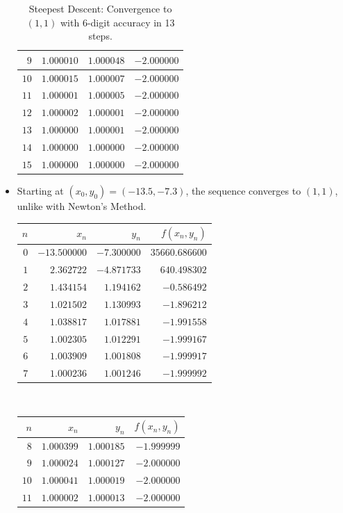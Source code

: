 \begin{example}
\begin{itemize}
\begin{table}[ht!]
\begin{tabular}{|r|r|r|r|}
	$9$ & $1.000010$ & $1.000048$ & $-2.000000$ \\ \hline 
	$10$ & $1.000015$ & $1.000007$ & $-2.000000$ \\ \hline 
	$11$ & $1.000001$ & $1.000005$ & $-2.000000$ \\ \hline 
	$12$ & $1.000002$ & $1.000001$ & $-2.000000$ \\ \hline 
	$13$ & $1.000000$ & $1.000001$ & $-2.000000$ \\ \hline 
	$14$ & $1.000000$ & $1.000000$ & $-2.000000$ \\ \hline 
	$15$ & $1.000000$ & $1.000000$ & $-2.000000$ \\ \hline 
	\end{tabular}
	\caption{Steepest Descent: Convergence to $(1,1)$ with 6-digit accuracy in 13 steps.}
	\label{table:SD11}
	\end{table}
	\item Starting at $(x_0, y_0) = (-13.5, -7.3)$, the sequence converges to $(1,1)$, unlike with Newton's Method.
	\begin{table}[ht!]
	\begin{tabular}{|r|r|r|r|} \hline 
	$n$ & $x_n$ & $y_n$ & $f(x_n,y_n)$ \\ \hline \hline 
	$0$ & $-13.500000$ & $-7.300000$ & $35660.686600$ \\ \hline 
	$1$ & $2.362722$ & $-4.871733$ & $640.498302$ \\ \hline 
	$2$ & $1.434154$ & $1.194162$ & $-0.586492$ \\ \hline 
	$3$ & $1.021502$ & $1.130993$ & $-1.896212$ \\ \hline 
	$4$ & $1.038817$ & $1.017881$ & $-1.991558$ \\ \hline 
	$5$ & $1.002305$ & $1.012291$ & $-1.999167$ \\ \hline 
	$6$ & $1.003909$ & $1.001808$ & $-1.999917$ \\ \hline 
	$7$ & $1.000236$ & $1.001246$ & $-1.999992$ \\ \hline 
	\end{tabular}~\begin{tabular}{|r|r|r|r|} \hline 
	$n$ & $x_n$ & $y_n$ & $f(x_n,y_n)$ \\ \hline \hline 
	$8$ & $1.000399$ & $1.000185$ & $-1.999999$ \\ \hline 
	$9$ & $1.000024$ & $1.000127$ & $-2.000000$ \\ \hline 
	$10$ & $1.000041$ & $1.000019$ & $-2.000000$ \\ \hline 
	$11$ & $1.000002$ & $1.000013$ & $-2.000000$ \\ \hline 

\end{tabular}
\end{table}
\end{itemize}
\end{example}
